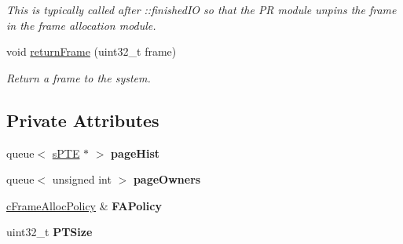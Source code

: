 \begin{DoxyCompactItemize}
\begin{DoxyCompactList}\small\item\em \-This is typically called after \-::finished\-I\-O so that the \-P\-R module unpins the frame in the frame allocation module. \end{DoxyCompactList}\item 
void \hyperlink{classcPRFifo_a8155953bcbd7a0799d07a8228dc0e80c}{return\-Frame} (uint32\-\_\-t frame)
\begin{DoxyCompactList}\small\item\em \-Return a frame to the system. \end{DoxyCompactList}\end{DoxyCompactItemize}
\subsection*{\-Private \-Attributes}
\begin{DoxyCompactItemize}
\item 
\hypertarget{classcPRFifo_a55cd40966135c67531087a943d69cd8a}{queue$<$ \hyperlink{structsPTE}{s\-P\-T\-E} $\ast$ $>$ {\bfseries page\-Hist}}\label{db/d3a/classcPRFifo_a55cd40966135c67531087a943d69cd8a}

\item 
\hypertarget{classcPRFifo_ac2eb1d98dce1f4d65fb50de514bff2c6}{queue$<$ unsigned int $>$ {\bfseries page\-Owners}}\label{db/d3a/classcPRFifo_ac2eb1d98dce1f4d65fb50de514bff2c6}

\item 
\hypertarget{classcPRFifo_af559318a9aec1a9bb80316fe75c95ebf}{\hyperlink{classcFrameAllocPolicy}{c\-Frame\-Alloc\-Policy} \& {\bfseries \-F\-A\-Policy}}\label{db/d3a/classcPRFifo_af559318a9aec1a9bb80316fe75c95ebf}

\item 
\hypertarget{classcPRFifo_ae007331b8af8dc84c4833846f7ca6dde}{uint32\-\_\-t {\bfseries \-P\-T\-Size}}\label{db/d3a/classcPRFifo_ae007331b8af8dc84c4833846f7ca6dde}

\end{DoxyCompactItemize}


